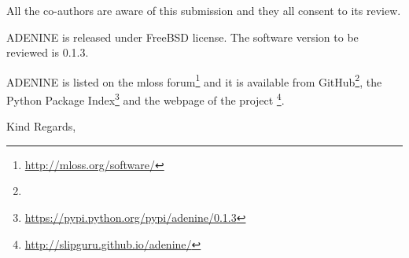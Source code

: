 \documentclass[11pt]{letter} %
\begin{document}
\begin{letter}
All the co-authors are aware of this submission and they all consent to its review.

%

{\sc ADENINE} is released under FreeBSD license. The software version to be reviewed is 0.1.3.

{\sc ADENINE} is listed on the mloss forum\footnote{\url{http://mloss.org/software/}} and it is available from GitHub\footnote{}, the Python Package Index\footnote{\url{https://pypi.python.org/pypi/adenine/0.1.3}} and the webpage of the project \footnote{\url{http://slipguru.github.io/adenine/}}.

\closing{Kind Regards,}




\end{letter}
\end{document}
